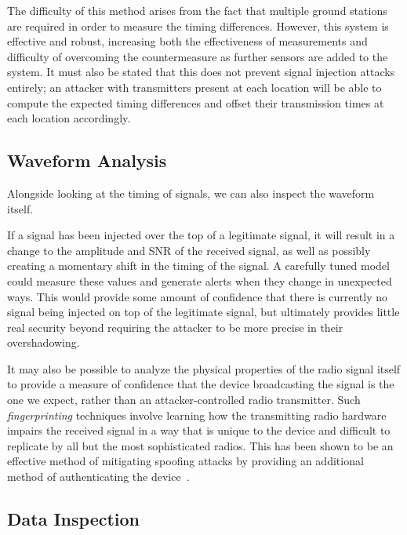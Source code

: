 The difficulty of this method arises from the fact that multiple ground stations are required in order to measure the timing differences.
However, this system is effective and robust, increasing both the effectiveness of measurements and difficulty of overcoming the countermeasure as further sensors are added to the system.
It must also be stated that this does not prevent signal injection attacks entirely; an attacker with transmitters present at each location will be able to compute the expected timing differences and offset their transmission times at each location accordingly.


\subsection{Waveform Analysis}

Alongside looking at the timing of signals, we can also inspect the waveform itself.

If a signal has been injected over the top of a legitimate signal, it will result in a change to the amplitude and SNR of the received signal, as well as possibly creating a momentary shift in the timing of the signal.
A carefully tuned model could measure these values and generate alerts when they change in unexpected ways.
This would provide some amount of confidence that there is currently no signal being injected on top of the legitimate signal, but ultimately provides little real security beyond requiring the attacker to be more precise in their overshadowing.

It may also be possible to analyze the physical properties of the radio signal itself to provide a measure of confidence that the device broadcasting the signal is the one we expect, rather than an attacker-controlled radio transmitter.
Such \textit{fingerprinting} techniques involve learning how the transmitting radio hardware impairs the received signal in a way that is unique to the device and difficult to replicate by all but the most sophisticated radios.
This has been shown to be an effective method of mitigating spoofing attacks by providing an additional method of authenticating the device~\cite{sankheNo2020}.


\subsection{Data Inspection}

